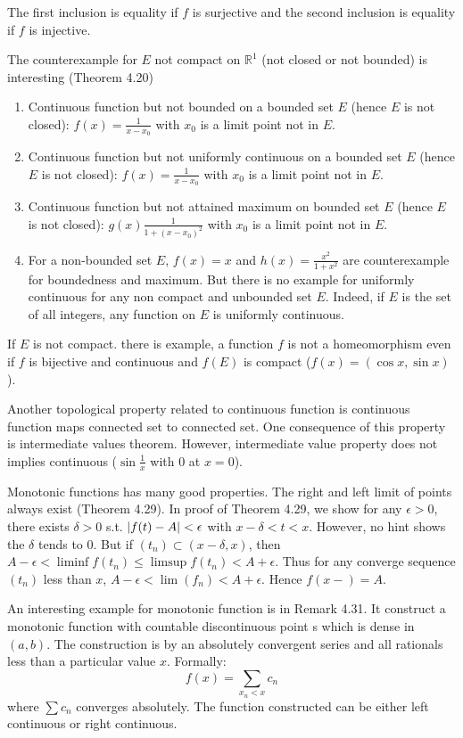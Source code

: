 \begin{remark}
    The first inclusion is equality if $f$ is surjective and the second inclusion is equality if $f$ is injective.
\end{remark}
The counterexample for $E$ not compact on $\mathbb{R}^1$ (not closed or not bounded) is interesting (Theorem 4.20)
\begin{enumerate}
    \item Continuous function but not bounded on a bounded set $E$ (hence $E$ is not closed): $f(x)=\frac{1}{x-x_0}$ with $x_0$ is a limit point not in $E$.
    \item  Continuous function but not uniformly continuous on a bounded set $E$ (hence $E$ is not closed): $f(x)=\frac{1}{x-x_0}$ with $x_0$ is a limit point not in $E$.
    \item  Continuous function but not attained maximum on bounded set $E$ (hence $E$ is not closed): $g(x)\frac{1}{1+(x-x_0)^2}$ with $x_0$ is a limit point not in $E$.
    \item For a non-bounded set $E$, $f(x)=x$ and $h(x)=\frac{x^2}{1+x^2}$ are counterexample for boundedness and maximum. But there is no example for uniformly continuous for any non compact and unbounded set $E$. Indeed, if $E$ is the set of all integers, any function on $E$ is uniformly continuous.
\end{enumerate}
If $E$ is not compact. there is example, a function $f$ is not a homeomorphism even if $f$ is bijective and continuous and $f(E)$ is compact ($f(x)=(\cos x,\sin x)$). \par
Another topological property related to continuous function is continuous function maps connected set to connected set. One consequence of this property is intermediate values theorem. However, intermediate value property does not implies continuous ($\sin \frac{1}{x}$ with $0$ at $x=0$).\par
Monotonic functions has many good properties. The right and left limit of points always exist (Theorem 4.29). In proof of Theorem 4.29, we show for any $\epsilon>0$, there exists $\delta>0$ s.t. $\left\lvert f(t)-A\right\rvert<\epsilon$ with $x-\delta<t<x$. However, no hint shows the $\delta$ tends to $0$. But if $(t_n)\subset (x-\delta,x)$, then $A-\epsilon<\liminf f(t_n)\leq \limsup f(t_n)<A+\epsilon$. Thus for any converge sequence $(t_n)$ less than $x$, $A-\epsilon<\lim (f_n)<A+\epsilon$. Hence $f(x-)=A$.\par
An interesting example for monotonic function is in Remark 4.31. It construct a monotonic function with countable discontinuous point s which is dense in $(a,b)$. The construction is by an absolutely convergent series and all rationals less than a particular value $x$. Formally:
\begin{equation*}
    f(x)=\sum_{x_n<x}c_n
\end{equation*}
where $\sum c_n$ converges absolutely. The function constructed can be either left continuous or right continuous.
